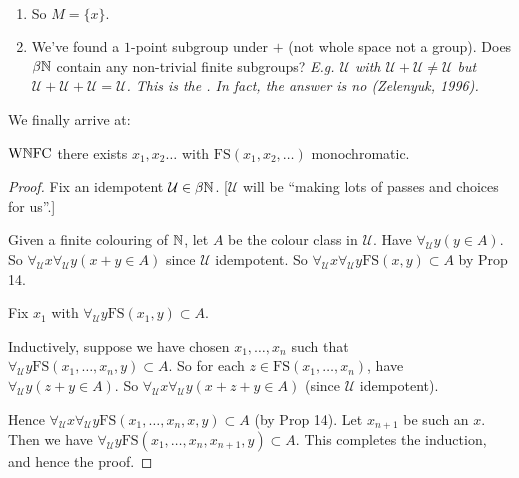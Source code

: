 \documentclass[10pt]{article}
\newcommand{\wnfc}{\textrm{W}\N\textrm{FC}}
\newcommand{\fs}{\textrm{FS}}
\newcommand{\U}{\mathcal{U}}
\newcommand{\fu}{\forall_\U}
\begin{document}
\begin{remark*}[Remarks]\ 
    \begin{enumerate}
        \item So $M = \{x\}$.
        \item We've found a $1$-point subgroup under $+$ (not whole space not a group). Does $\beta\mathbb{N}$ contain any non-trivial finite subgroups? \it{E.g.} $\U$ with $\U + \U \ne \U$ but $\U + \U + \U = \U$. This is the . In fact, the answer is \it{no} (Zelenyuk, 1996).
    \end{enumerate}
\end{remark*}

We finally arrive at:

\begin{theorem}
    $\wnfc$ there exists $x_1,x_2\dots$ with $\fs(x_1,x_2,\dots)$ monochromatic.
\end{theorem}
\begin{proof}
    Fix an idempotent $\U \in \beta\N$. [$\U$ will be ``making lots of passes and choices for us''.]

    Given a finite colouring of $\mathbb{N}$, let $A$ be the colour class in $\U$. Have $\fu y (y \in A)$. So $\fu x \fu y (x+y\in A)$ since $\U$ idempotent. So $\fu x\fu y\fs(x,y)\subset A$ by Prop 14.

    Fix $x_1$ with $\fu y \fs(x_1,y)\subset A$.

    Inductively, suppose we have chosen $x_1,\dots,x_n$ such that $\fu y \fs(x_1,\dots,x_n,y)\subset A$. So for each $z \in \fs(x_1,\dots,x_n)$, have $\fu y (z+y\in A)$. So $\fu x \fu y (x + z + y \in A)$ (since $\U$ idempotent).

    Hence $\fu x \fu y \fs(x_1,\dots,x_n,x,y)\subset A$ (by Prop 14). Let $x_{n+1}$ be such an $x$. Then we have $\fu y \fs(x_1,\dots,x_n,x_{n+1},y)\subset A$. This completes the induction, and hence the proof.
\end{proof}
\end{document}
